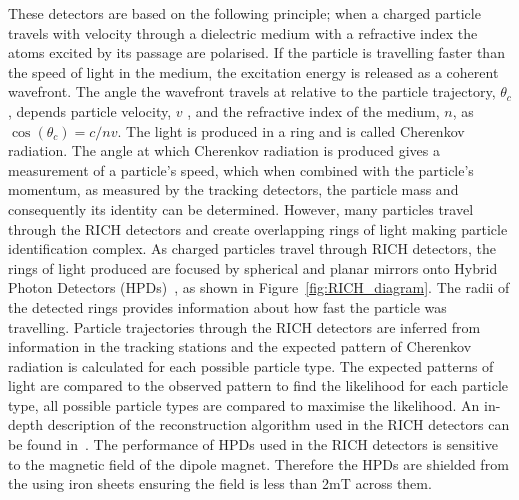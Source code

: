 These detectors are based on the following principle; when a charged particle travels with velocity through a dielectric medium with a refractive index the atoms excited by its passage are polarised. If the particle is travelling faster than the speed of light in the medium, the excitation energy is released as a coherent wavefront. The angle the wavefront travels at relative to the particle trajectory, $\theta_{c}$, depends particle velocity, $v$ , and the refractive index of the medium, $n$, as $\cos(\theta_{c}) = c/nv$. The light is produced in a ring and is called Cherenkov radiation. %
The angle at which Cherenkov radiation is produced gives a measurement of a particle’s speed, which when combined with the particle’s momentum, as measured by the tracking detectors, the particle mass and consequently its identity can be determined. However, many particles travel through the RICH detectors and create overlapping rings of light making particle identification complex. As charged particles travel through RICH detectors, the rings of light produced are focused by spherical and planar mirrors onto Hybrid Photon Detectors (HPDs)~\cite{Alemi:1999np}, as shown in Figure~\ref{fig:RICH_diagram}. The radii of the detected rings provides information about how fast the particle was travelling.
Particle trajectories through the RICH detectors are inferred from information in the tracking stations and the expected pattern of Cherenkov radiation is calculated for each possible particle type. The expected patterns of light are compared to the observed pattern to find the likelihood for each particle type, all possible particle types are compared to maximise the likelihood. An in-depth description of the reconstruction algorithm used in the RICH detectors can be found in~\cite{Forty:684714}. 
The performance of HPDs used in the RICH detectors is sensitive to the magnetic field of the dipole magnet.
Therefore the HPDs are shielded from the using iron sheets ensuring the field is less than 2mT across them. %

